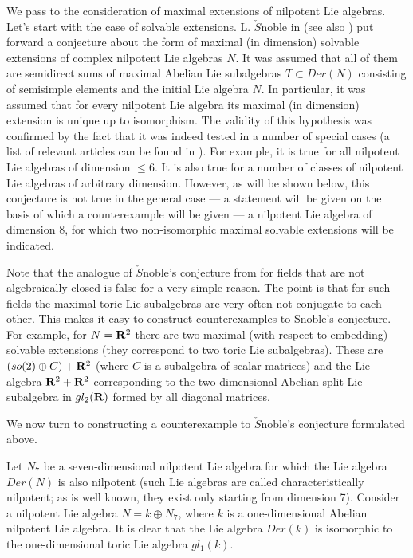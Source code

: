 \documentclass{amsart}
\begin{document}
We pass to the consideration of maximal extensions of nilpotent Lie algebras. Let's start with the case of solvable extensions.
L. $\check{S}$noble in \cite {Sn} (see also \cite {SnW}) put forward a conjecture about the form of maximal (in dimension) solvable extensions of complex nilpotent Lie algebras $N$. It was assumed that all of them are semidirect sums of maximal Abelian Lie subalgebras $T\subset Der(N)$ consisting of semisimple elements and the initial Lie algebra $N$. In particular, it was assumed that for every nilpotent Lie algebra its maximal (in dimension) extension is unique up to isomorphism. The validity of this hypothesis was confirmed by the fact that it was indeed tested in a number of special cases (a list of relevant articles can be found in \cite {Sn}). For example, it is true for all nilpotent Lie algebras of dimension $\le 6$. It is also true for a number of classes of nilpotent Lie algebras of arbitrary dimension. However, as will be shown below, this conjecture is not true in the general case --- a statement will be given on the basis of which a counterexample will be given --- a nilpotent Lie algebra of dimension 8, for which two non-isomorphic maximal solvable extensions will be indicated.

Note that the analogue of $\check{S}$noble's conjecture from \cite {Sn} for fields that are not algebraically closed is false for a very simple reason. The point is that for such fields the maximal toric Lie subalgebras are very often not conjugate to each other. This makes it easy to construct counterexamples to Snoble's conjecture. For example, for $N={\bf R}^2$ there are two maximal (with respect to embedding) solvable extensions (they correspond to two toric Lie subalgebras). These are $(so(2)\oplus C)+{\bf R}^2$ (where $C$ is a subalgebra of scalar matrices) and the Lie algebra ${\bf R}^2+{\bf R}^ 2$ corresponding to the two-dimensional Abelian split Lie subalgebra in $gl_2(\bf R)$ formed by all diagonal matrices.

We now turn to constructing a counterexample to $\check{S}$noble's conjecture formulated above.

Let $N_7$ be a seven-dimensional nilpotent Lie algebra for which the Lie algebra $Der(N)$ is also nilpotent (such Lie algebras are called characteristically nilpotent; as is well known, they exist only starting from dimension 7). Consider a nilpotent Lie algebra $N = k\oplus N_7$, where $k$ is a one-dimensional Abelian nilpotent Lie algebra. It is clear that the Lie algebra $Der(k)$ is isomorphic to the one-dimensional toric Lie algebra $gl_1(k)$.
\end{document}
